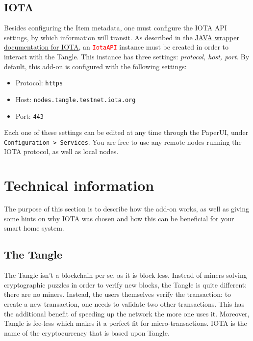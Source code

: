 \documentclass[a4paper,10pt]{article}
\begin{document}
\subsection{IOTA}

\noindent Besides configuring the Item metadata, one must configure the IOTA API settings, by which information will transit. As described in the \textcolor{blue}{\underline{\href{https://github.com/iotaledger/iota.lib.java}{JAVA wrapper documentation for IOTA}}}, an \texttt{\textcolor{red}{IotaAPI}} instance must be created in order to interact with the Tangle. This instance has three settings: \textit{protocol, host, port}. By default, this add-on is configured with the following settings: \\

\begin{itemize}
	\item Protocol: \texttt{https}
	\item Host: \texttt{nodes.tangle.testnet.iota.org}
	\item Port: \texttt{443}
\end{itemize} 

\bigskip

\noindent Each one of these settings can be edited at any time through the PaperUI, under \texttt{Configuration > Services}. You are free to use any remote nodes running the IOTA protocol, as well as local nodes. 

\section{Technical information}

The purpose of this section is to describe how the add-on works, as well as giving some hints on why IOTA was chosen and how this can be beneficial for your smart home system.

\subsection{The Tangle}

The Tangle isn’t a blockchain per se, as it is block-less. Instead of miners solving cryptographic puzzles in order to verify new blocks, the Tangle is quite different: there are no miners. Instead, the users themselves verify the transaction: to create a new transaction, one needs to validate two other transactions. This has the additional benefit of speeding up the network the more one uses it. Moreover, Tangle is fee-less which makes it a perfect fit for micro-transactions. IOTA is the name of the cryptocurrency that is based upon Tangle. \\
\end{document}
